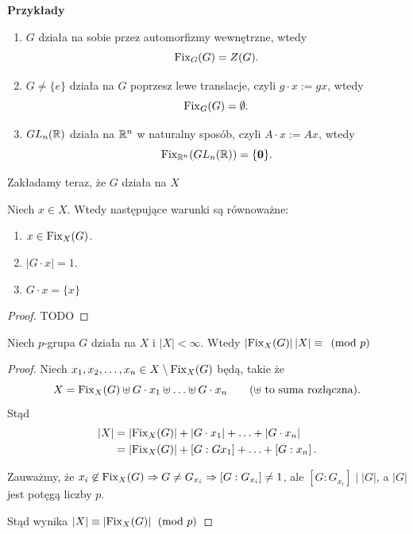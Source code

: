 \textbf{Przykłady} 
	
\begin{enumerate}[label=\arabic*.]
	\item $G$ działa na sobie przez automorfizmy wewnętrzne, wtedy 
		 \[
		\operatorname{Fix}_{G}(G) = Z(G)
		.\] 
	\item $G\neq \{e\}$ działa na $G$ poprzesz lewe translacje, czyli $g\cdot x:= gx$, wtedy
		 \[
		\operatorname{Fix}_{G}(G) = \emptyset
		.\] 
	\item $GL_{n}(\mathbb{R})$ działa na $\mathbb{R}^{n}$ w naturalny sposób, czyli $A\cdot x:= Ax$, wtedy
		\[
			\operatorname{Fix}_{\mathbb{R}^{n}}(GL_{n}(\mathbb{R})) = \{\mathbf{0}\} 
		.\] 
\end{enumerate}

\begin{context}

	Zakładamy teraz, że $G$ działa na $X$
\end{context}
Niech $x\in X$. Wtedy następujące warunki są równoważne:
\begin{enumerate}[label=\alph*)]
	\item $x\in \operatorname{Fix}_{X}(G) $.
	\item $\left| G\cdot x \right| = 1$.
	\item $G\cdot x = \{x\} $
\end{enumerate}
\begin{proof}
	TODO
\end{proof} 
\begin{lemma}
	Niech $p$-grupa $G$ działa na $X$ i $\left| X \right| < \infty$. Wtedy $\left| \operatorname{Fix}_{X}(G)  \right| \left| X \right|  \equiv \pmod{p}  $
\end{lemma} 
\begin{proof}
	Niech $x_1,x_2,\ldots,x_{n}\in X\setminus \operatorname{Fix}_{X}(G)$ będą, takie że
	\[
		X = \operatorname{Fix}_{X}(G) \uplus G\cdot x_1 \uplus \ldots \uplus G\cdot x_{n}\tag{$\uplus$ to suma rozłączna}
	.\] 
	Stąd 
	 \begin{align*}
		\left| X \right| &= \left| \operatorname{Fix}_{X}(G)  \right| + \left| G\cdot x_1 \right| + \ldots + \left| G\cdot x_{n} \right|  \\
		&= \left| \operatorname{Fix}_{X}(G)  \right| + \left[ G:Gx_{1} \right] + \ldots + \left[ G:x_{n} \right] 
	.\end{align*}
	
	Zauważmy, że $x_{i}\not\in \operatorname{Fix}_{X}(G) \Rightarrow G\neq G_{x_{i}} \Rightarrow \left[ G:G_{x_{i}} \right] \neq 1$,
	ale $\left[ G:G_{x_{i}} \right] \mid \left| G \right| $, a $\left| G \right| $ jest potęgą liczby $p$.

	Stąd wynika $\left| X \right|  \equiv \left| \operatorname{Fix}_{X}(G)  \right| \pmod{p} $
\end{proof} 

